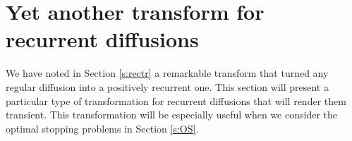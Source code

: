 \documentclass[11pt,reqno]{amsart}
\numberwithin{equation}{section}
\newtheorem{remark}{Remark}[section]
\def\rar{\rightarrow}
\begin{document}
%
\section{Yet another transform for recurrent diffusions} \label{s:another}
We have noted in Section \ref{s:rectr} a remarkable transform that turned any regular diffusion into a positively recurrent one. This section will present a particular type of transformation for recurrent diffusions that will render them transient. This transformation will be especially useful when we consider the optimal stopping problems in Section \ref{s:OS}.
\end{document}
